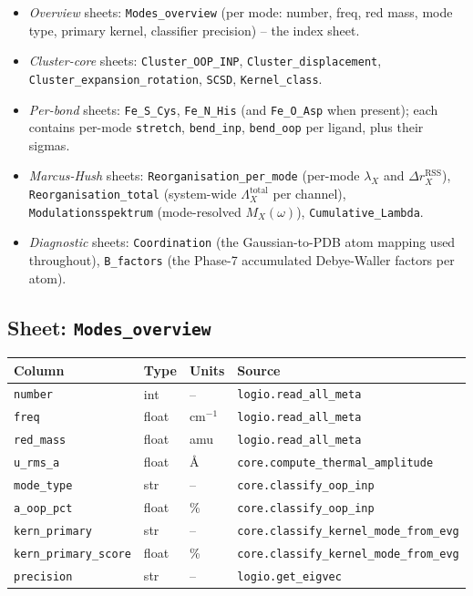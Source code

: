 \documentclass[10pt,a4paper,twoside]{article}
\newcommand{\fn}[1]{\texttt{#1}}
\begin{document}
\begin{itemize}
  \item \emph{Overview} sheets: \texttt{Modes\_overview} (per mode:
        number, freq, red mass, mode type, primary kernel, classifier
        precision) -- the index sheet.
  \item \emph{Cluster-core} sheets: \texttt{Cluster\_OOP\_INP},
        \texttt{Cluster\_displacement},
        \texttt{Cluster\_expansion\_rotation}, \texttt{SCSD},
        \texttt{Kernel\_class}.
  \item \emph{Per-bond} sheets: \texttt{Fe\_S\_Cys},
        \texttt{Fe\_N\_His} (and \texttt{Fe\_O\_Asp} when present);
        each contains per-mode \texttt{stretch}, \texttt{bend\_inp},
        \texttt{bend\_oop} per ligand, plus their sigmas.
  \item \emph{Marcus-Hush} sheets: \texttt{Reorganisation\_per\_mode}
        (per-mode $\lambda_X$ and $\Delta r_X^\text{RSS}$),
        \texttt{Reorganisation\_total} (system-wide
        $\Lambda_X^\text{total}$ per channel),
        \texttt{Modulationsspektrum} (mode-resolved $M_X(\omega)$),
        \texttt{Cumulative\_Lambda}.
  \item \emph{Diagnostic} sheets: \texttt{Coordination} (the
        Gaussian-to-PDB atom mapping used throughout),
        \texttt{B\_factors} (the Phase-7 accumulated Debye-Waller
        factors per atom).
\end{itemize}

\subsection{Sheet: \texttt{Modes\_overview}}

\begin{longtable}{p{} p{} p{} p{}}
\toprule
\textbf{Column} & \textbf{Type} & \textbf{Units} & \textbf{Source} \\
\midrule
\texttt{number}            & int    & --            & \fn{logio.read\_all\_meta} \\
\texttt{freq}              & float  & cm$^{-1}$     & \fn{logio.read\_all\_meta} \\
\texttt{red\_mass}         & float  & amu           & \fn{logio.read\_all\_meta} \\
\texttt{u\_rms\_a}         & float  & \AA{}         & \fn{core.compute\_thermal\_amplitude} \\
\texttt{mode\_type}        & str    & --            & \fn{core.classify\_oop\_inp} \\
\texttt{a\_oop\_pct}       & float  & \%            & \fn{core.classify\_oop\_inp} \\
\texttt{kern\_primary}     & str    & --            & \fn{core.classify\_kernel\_mode\_from\_evg} \\
\texttt{kern\_primary\_score} & float & \%          & \fn{core.classify\_kernel\_mode\_from\_evg} \\
\texttt{precision}         & str    & --            & \fn{logio.get\_eigvec} \\
\bottomrule
\end{longtable}
\end{document}

